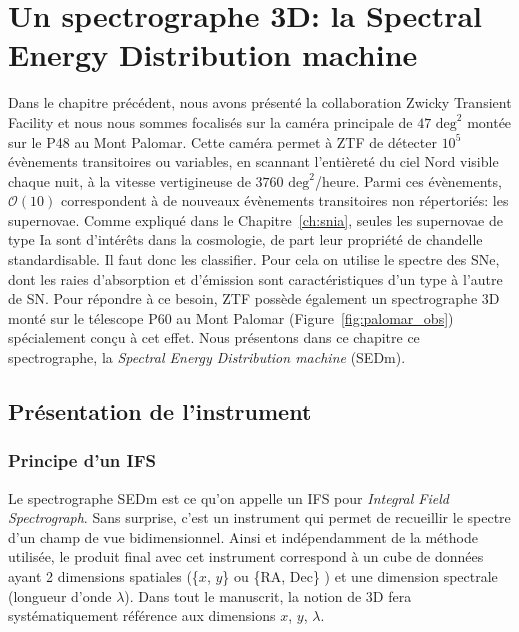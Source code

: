 \documentclass[../main/main.tex]{subfiles}
\begin{document}
\setcounter{chapter}{3}
\chapter{Un spectrographe 3D: la Spectral Energy Distribution machine}\label{ch:sedm}

\minitoc
\vspace{2cm}
Dans le chapitre précédent, nous avons présenté la collaboration Zwicky
Transient Facility et nous nous sommes focalisés sur la caméra
principale de $47\text{ deg}^{2}$ montée sur le P48 au Mont
Palomar. Cette caméra permet à ZTF de détecter $10^{5}$ évènements
transitoires ou variables, en scannant l'entièreté du ciel Nord visible
chaque nuit,  à la vitesse
vertigineuse de $3760\text{ deg}^{2}$/heure. Parmi ces évènements,
$\mathcal{O}(10)$ correspondent à de nouveaux évènements transitoires non
répertoriés: les supernovae. Comme expliqué dans le
Chapitre~\ref{ch:snia}, seules les supernovae de type Ia sont
d'intérêts dans la cosmologie, de part leur propriété de chandelle
standardisable. Il faut donc les classifier. Pour cela on utilise le
spectre des SNe, dont les raies d'absorption et d'émission sont caractéristiques d'un
type à l'autre de SN. Pour répondre à ce besoin, ZTF possède également un spectrographe 3D
monté sur le télescope P60 au Mont Palomar
(Figure~\ref{fig:palomar_obs}) spécialement conçu à cet effet. Nous
présentons dans ce chapitre ce spectrographe, la \textit{Spectral Energy
Distribution machine} (SEDm).
\newpage

\section{Présentation de l'instrument}
\label{sec:ifs}

\subsection{Principe d'un IFS}
Le spectrographe SEDm est ce qu'on appelle un IFS pour \textit{Integral Field
Spectrograph}. Sans surprise, c'est un instrument qui permet de
recueillir le spectre d'un champ de vue bidimensionnel.
Ainsi et indépendamment de la méthode utilisée, le produit final avec
cet instrument correspond à
un cube de données ayant 2 dimensions spatiales (\{$x$, $y$\} ou \{RA,
Dec\} ) et une dimension spectrale (longueur d'onde $\lambda$). Dans tout le manuscrit, la notion de 3D fera
systématiquement référence aux dimensions \og $x$, $y$, $\lambda$\fg{}.
\end{document}
